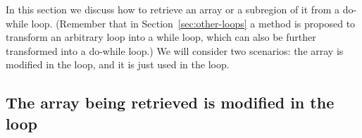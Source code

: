 
In this section we discuss how to retrieve an array or a subregion of it from a do-while loop. 
(Remember that in Section~\ref{sec:other-loops} a method is proposed to transform an arbitrary loop into a while loop, which can also be further transformed into a do-while loop.)
We will consider two scenarios: the array is modified in the loop, and it is just used in the loop.






\subsection{The array being retrieved is modified in the loop}


\newcommand{\Iuse}{\ensuremath{\mathcal{I}^a_{use}}\xspace}
\newcommand{\Idef}{\ensuremath{\mathcal{I}^a_{def}}\xspace}
\newcommand{\iternum}{\ensuremath{l.len}\xspace}
\newcommand{\Ra}{\ensuremath{\mathcal{R}^t_{I}}\xspace}
\newcommand{\RaComp}{\ensuremath{\overline{\Ra}}\xspace}
\newcommand{\Rb}{\ensuremath{\mathcal{R}^t_O}\xspace}
\newcommand{\Rc}{\ensuremath{\mathcal{R}^t_{O}}\xspace}
\newcommand{\RcComp}{\ensuremath{\overline{\Rc}}\xspace}
\newcommand{\Rd}{\ensuremath{\mathcal{R}_{U}}\xspace}
\newcommand{\Subr}[2]{\ensuremath{R^a_{def}(#1,#2)}\xspace}
\newcommand{\Span}[1]{\ensuremath{\bigcup_{t\in[0,\iternum)}{#1}}\xspace}
\newcommand{\Edge}[2]{\ensuremath{#1\leftrightarrow#2}\xspace}\newcommand{\EdgeRight}[2]{\ensuremath{#1\rightarrow#2}\xspace}\newcommand{\EdgeLeft}[2]{\ensuremath{#1\leftarrow#2}\xspace}
\newcommand{\SearchVal}[2]{\ensuremath{\texttt{Search}(#1,#2)}\xspace}
\newcommand{\EdgeWithSubregion}[3]{\ensuremath{#1 \overset{#2}\longrightarrow #3}\xspace}
\newcommand{\LoopInput}[1]{\ensuremath{#1_{init}}\xspace}
\newcommand{\LoopOutput}[1]{\ensuremath{#1_{final}}\xspace}
\newcommand{\IterInput}[1]{\ensuremath{#1_{in}}\xspace}
\newcommand{\IterOutput}[1]{\ensuremath{#1_{out}}\xspace}
\newcommand{\AIn}{\ensuremath{\LoopInput{a}}\xspace}
\newcommand{\AOut}{\ensuremath{\LoopOutput{a}}\xspace}
\newcommand{\AInI}{\ensuremath{\IterInput{a}}\xspace}
\newcommand{\AOutI}{\ensuremath{\IterOutput{a}}\xspace}
\newcommand{\IterInputSet}{\ensuremath{\mathcal{A}_{in}}\xspace}
\newcommand{\IterOutputSet}{\ensuremath{\mathcal{A}_{out}}\xspace}




